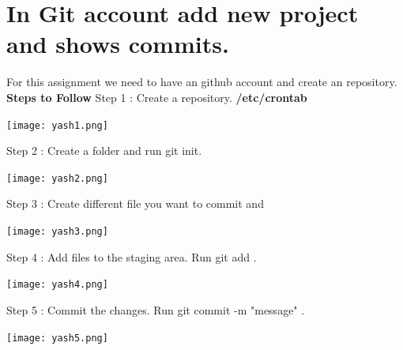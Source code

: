 \documentclass{article}
\begin{document}
\section{In Git account add new project and shows commits.}
For this assignment we need to have an github account and create an repository.
\newline
\newline
\textbf{Steps to Follow}
\newline
Step 1 : Create a repository. \textbf{/etc/crontab}\newline
\begin{center}
    \texttt{[image: yash1.png]}
\end{center}
Step 2 : Create a folder and run git init.\newline
\begin{center}
    \texttt{[image: yash2.png]}
\end{center}
Step 3 : Create different file you want to commit and \newline
\begin{center}
    \texttt{[image: yash3.png]}
\end{center}
\newpage
Step 4 : Add files to the staging area. Run git add . \newline
\begin{center}
    \texttt{[image: yash4.png]}
\end{center}
\newpage
Step 5 : Commit the changes. Run git commit -m "message" . \newline
\begin{center}
    \texttt{[image: yash5.png]}
\end{center}
\newpage
\end{document}
